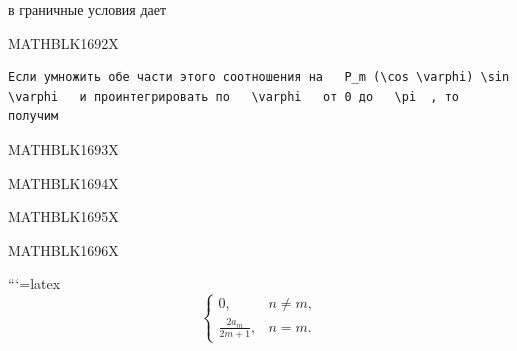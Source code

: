 \documentclass[
]{article}
\begin{document}
в граничные условия дает

MATHBLK1692X

\begin{verbatim}
Если умножить обе части этого соотношения на   P_m (\cos \varphi) \sin \varphi   и проинтегрировать по   \varphi   от 0 до   \pi  , то получим
\end{verbatim}

MATHBLK1693X

MATHBLK1694X

MATHBLK1695X

MATHBLK1696X

```{=latex}
\[
\begin{cases} 0, & n \neq m, \\ \frac{2a_{m}}{2m+1}, & n = m. \end{cases}
\]
\end{document}

